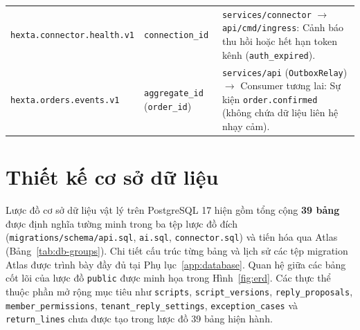 \begin{table}[htbp]
\begin{tabularx}{\linewidth}{@{}
    >{\raggedright\arraybackslash}p{4.5cm}
    >{\raggedright\arraybackslash}p{4.3cm}
    >{\raggedright\arraybackslash}X@{}}
    \texttt{hexta.\hspace{0pt}connector.\hspace{0pt}health.\hspace{0pt}v1} & \texttt{connection\_\hspace{0pt}id} & \texttt{services/\hspace{0pt}connector} $\rightarrow$ \texttt{api/\hspace{0pt}cmd/\hspace{0pt}ingress}: Cảnh báo thu hồi hoặc hết hạn token kênh (\texttt{auth\_\hspace{0pt}expired}). \\
    \texttt{hexta.\hspace{0pt}orders.\hspace{0pt}events.\hspace{0pt}v1} & \texttt{aggregate\_\hspace{0pt}id} (\texttt{order\_\hspace{0pt}id}) & \texttt{services/\hspace{0pt}api} (\texttt{OutboxRelay}) $\rightarrow$ Consumer tương lai: Sự kiện \texttt{order.\hspace{0pt}confirmed} (không chứa dữ liệu liên hệ nhạy cảm). \\
    \bottomrule
  \end{tabularx}
\end{table}

\section{Thiết kế cơ sở dữ liệu}
Lược đồ cơ sở dữ liệu vật lý trên PostgreSQL 17 hiện gồm tổng cộng \textbf{39 bảng} được định nghĩa tường minh trong ba tệp lược đồ đích (\texttt{migrations/\hspace{0pt}schema/\hspace{0pt}api.\hspace{0pt}sql}, \texttt{ai.\hspace{0pt}sql}, \texttt{connector.\hspace{0pt}sql}) và tiến hóa qua Atlas (Bảng~\ref{tab:db-groups}).
Chi tiết cấu trúc từng bảng và lịch sử các tệp migration Atlas được trình bày đầy đủ tại Phụ lục~\ref{app:database}.
Quan hệ giữa các bảng cốt lõi của lược đồ \texttt{public} được minh họa trong Hình~\ref{fig:erd}.
Các thực thể thuộc phần mở rộng mục tiêu như \texttt{scripts}, \texttt{script\_\hspace{0pt}versions}, \texttt{reply\_\hspace{0pt}proposals}, \texttt{member\_\hspace{0pt}permissions}, \texttt{tenant\_\hspace{0pt}reply\_\hspace{0pt}settings}, \texttt{exception\_\hspace{0pt}cases} và \texttt{return\_\hspace{0pt}lines} chưa được tạo trong lược đồ 39 bảng hiện hành.

